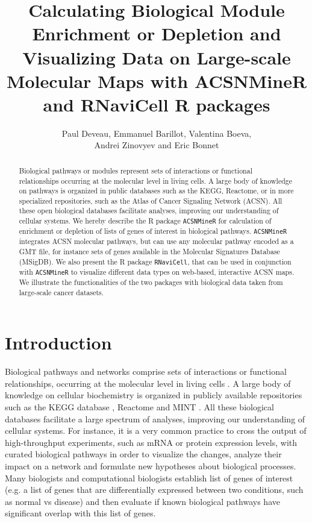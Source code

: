 \documentclass{article}
\author{Paul Deveau, Emmanuel Barillot, Valentina Boeva, \\Andrei Zinovyev and Eric Bonnet} %
\title{Calculating Biological Module Enrichment or Depletion and Visualizing Data on Large-scale Molecular Maps with ACSNMineR and RNaviCell R packages} %
\begin{document}
\maketitle

\begin{abstract}
Biological pathways or modules represent sets of interactions or functional
relationships occurring at the molecular level in living cells. A large body of
knowledge on pathways is organized in public databases such as the KEGG,
Reactome, or in more specialized repositories, such as the Atlas of Cancer
Signaling Network (ACSN). All these open biological databases facilitate
analyses, improving our understanding of cellular systems. We hereby describe
the R package \verb|ACSNMineR| for calculation of enrichment or depletion of
lists of genes of interest in biological pathways. \verb|ACSNMineR| integrates
ACSN molecular pathways, but can use any molecular pathway encoded as a GMT
file, for instance sets of genes available in the Molecular Signatures Database
(MSigDB). We also present the R package \verb|RNaviCell|, that can be used in
conjunction with \verb|ACSNMineR| to visualize different data types on
web-based, interactive ACSN maps. We illustrate the functionalities of the two
packages with biological data taken from large-scale cancer datasets.
\end{abstract}


\section[Introduction]{Introduction}
Biological pathways and networks comprise sets of interactions or functional
relationships, occurring at the molecular level in living cells
\cite{adriaens2008public, barillot2012computational}.  A large body of
knowledge on cellular biochemistry is organized in publicly available
repositories such as the KEGG database \cite{kanehisa2011kegg}, Reactome
\cite{croft2014reactome} and MINT \cite{zanzoni2002mint}. All these
biological databases facilitate a large spectrum of analyses, improving our
understanding of cellular systems. For instance, it is a very common practice
to cross the output of high-throughput experiments, such as mRNA or protein
expression levels, with curated biological pathways in order to visualize the
changes, analyze their impact on a network and formulate new hypotheses about
biological processes. Many biologists and computational biologists establish
list of genes of interest (e.g. a list of genes that are differentially
expressed between two conditions, such as normal vs disease) and then evaluate
if known biological pathways have significant overlap with this list of genes. 
\end{document}
